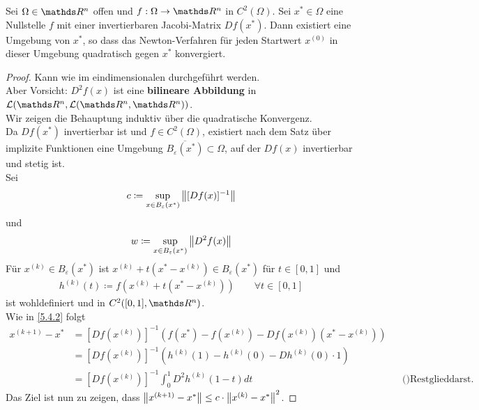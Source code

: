 \begin{Satze}
  Sei $\Omega\in\R^n$ offen und $f:\Omega\rightarrow\Ren$ in $C^2(\Omega)$.
  Sei $x^{*}\in\Omega $ eine Nullstelle $f$ mit einer invertierbaren Jacobi-Matrix $Df(x^{*})$.
  Dann existiert eine Umgebung von $x^{*}$, so dass das Newton-Verfahren 
  für jeden Startwert $x^{(0)}$ in dieser Umgebung
  quadratisch gegen $x^{*}$ konvergiert.
\end{Satze}

\begin{proof}
  Kann wie im eindimensionalen durchgeführt werden.\\
  Aber Vorsicht: $D^2f(x)$ ist eine \textbf{bilineare Abbildung} in 
  $\mathcal{L}(\Ren, \mathcal{L}(\Ren, \Ren))$. \\
  
  Wir zeigen die Behauptung induktiv über die quadratische Konvergenz.\\
  Da $Df(x^{*})$ invertierbar ist und $f\in C^2(\Omega) $,
  existiert nach dem Satz über implizite Funktionen
  eine Umgebung $\overline{B_\varepsilon(x^{*})}\subset \Omega$,
  auf der $Df(x)$ invertierbar und stetig ist.\\
  Sei 
  \begin{gather*}
    c\coloneqq \sup_{x\in B_\varepsilon(x^{*})} \left\| [Df(x)]^{-1} \right\|
  \end{gather*}
  und 
  \begin{gather*}
    w\coloneqq \sup_{x\in B_\varepsilon(x^{*})}\left\| D^2f(x) \right\|
  \end{gather*}
  Für $x^{(k)}\in B_\varepsilon(x^{*}) $ ist $x^{(k)}+t(x^{*}-x^{(k)})\in B_\varepsilon(x^{*})$
  für $t\in [0,1]$ und 
  \begin{gather*}
    h^{(k)}(t) \coloneqq f(x^{(k)}+ t(x^{*}-x^{(k)}))\qquad \forall t\in [0,1]
  \end{gather*}
  ist wohldefiniert und in $C^2([0,1], \Ren)$.\\
  Wie in \ref{5.4.2} folgt 
  \begin{align*}
    x^{(k+1)}-x^{*} &= [Df(x^{(k)})]^{-1}\left(f(x^{*})-f(x^{(k)})-Df(x^{(k)})(x^{*}-x^{(k)})\right)\\
                    &= [Df(x^{(k)})]^{-1}\left( h^{(k)}(1)-h^{(k)}(0)-Dh^{(k)}(0)\cdot 1\right)\\
                    &= [Df(x^{(k)})]^{-1} \int_{0}^{1}D^2h^{(k)}(1-t)dt &&\text{()Restglieddarst. der Taylorentw.)}
  \end{align*}
  Das Ziel ist nun zu zeigen, dass $\left\| x^{(k+1)}-x^{*} \right\| \leq c\cdot \left\| x^{(k)}-x^{*} \right\|^2$.

\end{proof}
